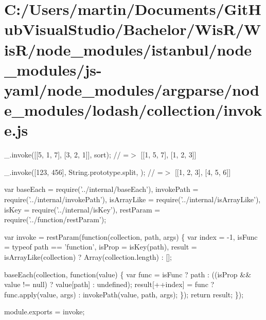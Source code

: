 \hypertarget{_c_1_2_users_2martin_2_documents_2_git_hub_visual_studio_2_bachelor_2_wis_r_2_wis_r_2node_module8c8cc7aba5f0c1ede5868dedc57812b1}{}\section{C\+:/\+Users/martin/\+Documents/\+Git\+Hub\+Visual\+Studio/\+Bachelor/\+Wis\+R/\+Wis\+R/node\+\_\+modules/istanbul/node\+\_\+modules/js-\/yaml/node\+\_\+modules/argparse/node\+\_\+modules/lodash/collection/invoke.\+js}
\+\_\+.\+invoke(\mbox{[}\mbox{[}5, 1, 7\mbox{]}, \mbox{[}3, 2, 1\mbox{]}\mbox{]}, \textquotesingle{}sort\textquotesingle{}); // =$>$ \mbox{[}\mbox{[}1, 5, 7\mbox{]}, \mbox{[}1, 2, 3\mbox{]}\mbox{]}

\+\_\+.\+invoke(\mbox{[}123, 456\mbox{]}, String.\+prototype.\+split, \textquotesingle{}\textquotesingle{}); // =$>$ \mbox{[}\mbox{[}\textquotesingle{}1\textquotesingle{}, \textquotesingle{}2\textquotesingle{}, \textquotesingle{}3\textquotesingle{}\mbox{]}, \mbox{[}\textquotesingle{}4\textquotesingle{}, \textquotesingle{}5\textquotesingle{}, \textquotesingle{}6\textquotesingle{}\mbox{]}\mbox{]}


\begin{DoxyCodeInclude}
var baseEach = require(\textcolor{stringliteral}{'../internal/baseEach'}),
    invokePath = require(\textcolor{stringliteral}{'../internal/invokePath'}),
    isArrayLike = require(\textcolor{stringliteral}{'../internal/isArrayLike'}),
    isKey = require(\textcolor{stringliteral}{'../internal/isKey'}),
    restParam = require(\textcolor{stringliteral}{'../function/restParam'});

var invoke = restParam(\textcolor{keyword}{function}(collection, path, args) \{
  var index = -1,
      isFunc = typeof path == \textcolor{stringliteral}{'function'},
      isProp = isKey(path),
      result = isArrayLike(collection) ? Array(collection.length) : [];

  baseEach(collection, \textcolor{keyword}{function}(value) \{
    var func = isFunc ? path : ((isProp && value != null) ? value[path] : undefined);
    result[++index] = func ? func.apply(value, args) : invokePath(value, path, args);
  \});
  \textcolor{keywordflow}{return} result;
\});

module.exports = invoke;
\end{DoxyCodeInclude}
 